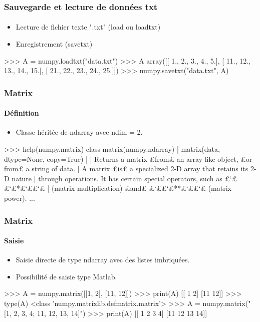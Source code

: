 \begin{frame}[fragile]
\frametitle{Sauvegarde et lecture de données txt}
\framesubtitle{}
\begin{itemize}
 \item Lecture de fichier texte ".txt" (load ou loadtxt) 
 \item Enregistrement (savetxt) 
\end{itemize}
\begin{pythonConsole}
>>> A = numpy.loadtxt("data.txt")
>>> A
array([[  1.,   2.,   3.,   4.,   5.],
       [ 11.,  12.,  13.,  14.,  15.],
       [ 21.,  22.,  23.,  24.,  25.]])
>>> numpy.savetxt("data.txt", A)
\end{pythonConsole}
\end{frame}
\begin{frame}[fragile]
\frametitle{Matrix}
\framesubtitle{Définition}
\begin{itemize}
 \item Classe héritée de ndarray avec ndim = 2.  
\end{itemize}
\begin{pythonConsole}
>>> help(numpy.matrix)
class matrix(numpy.ndarray)
 |  matrix(data, dtype=None, copy=True)
 |  
 |  Returns a matrix £from£ an array-like object, £or from£ a string of data.
 |  A matrix £is£ a specialized 2-D array that retains its 2-D nature
 |  through operations.  It has certain special operators, such as £`££`£*£`££`£
 |  (matrix multiplication) £and£ £`££`£**£`££`£ (matrix power).
...
\end{pythonConsole}
\end{frame}
\begin{frame}[fragile]
\frametitle{Matrix}
\framesubtitle{Saisie}
\begin{itemize}
 \item Saisie directe de type ndarray avec des listes imbriquées. 
 \item Possibilité de saisie type Matlab.
\end{itemize}
\begin{pythonConsole}
>>> A = numpy.matrix([[1, 2], [11, 12]])
>>> print(A)
[[ 1  2]
 [11 12]]
>>> type(A)
 <class 'numpy.matrixlib.defmatrix.matrix'>
>>> A = numpy.matrix("[1, 2, 3, 4; 11, 12, 13, 14]")
>>> print(A)
[[ 1  2  3  4]
 [11 12 13 14]]
\end{pythonConsole}
\end{frame}
